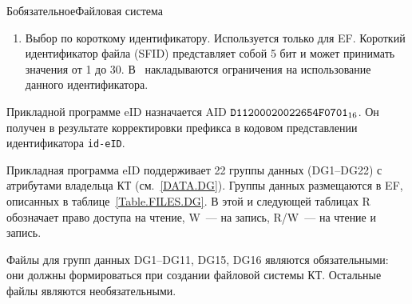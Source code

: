 \begin{appendix}{Б}{обязательное}{Файловая система}
\begin{enumerate}
\item
Выбор по короткому идентификатору. Используется только для EF. Короткий
идентификатор файла (SFID) представляет собой 5 бит и может принимать значения
от 1 до 30. В~\cite{APDU} накладываются ограничения на использование данного
идентификатора.
\fi
\end{enumerate}


Прикладной программе eID назначается AID $\texttt{D11200020022654F0701}_{16}$. 
Он получен в результате корректировки префикса в кодовом представлении 
идентификатора \verb|id-eID|.
%

Прикладная программа eID поддерживает 22 группы 
данных (DG1--DG22) с атрибутами владельца КТ (см.~\ref{DATA.DG}). 
%
Группы данных размещаются в EF, описанных в таблице~\ref{Table.FILES.DG}. 
%
В этой и следующей таблицах R обозначает право доступа на чтение, 
W~--- на запись, R/W~--- на чтение и запись.

Файлы для групп данных DG1--DG11, DG15, DG16 являются обязательными:
они должны формироваться при создании файловой системы КТ. 
Остальные файлы являются необязательными.  
 

\end{appendix}
